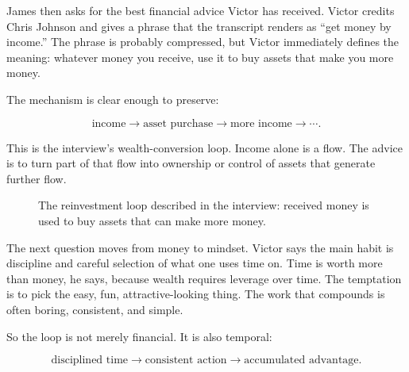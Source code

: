 James then asks for the best financial advice Victor has received. Victor credits Chris Johnson and gives a phrase that the transcript renders as ``get money by income.'' The phrase is probably compressed, but Victor immediately defines the meaning: whatever money you receive, use it to buy assets that make you more money.

The mechanism is clear enough to preserve:

\begin{equation}
\text{income}
\longrightarrow
\text{asset purchase}
\longrightarrow
\text{more income}
\longrightarrow
\cdots.
\end{equation}

This is the interview's wealth-conversion loop. Income alone is a flow. The advice is to turn part of that flow into ownership or control of assets that generate further flow.

\begin{figure}[h]
\centering
{}
\caption{The reinvestment loop described in the interview: received money is used to buy assets that can make more money.}
\end{figure}

The next question moves from money to mindset. Victor says the main habit is discipline and careful selection of what one uses time on. Time is worth more than money, he says, because wealth requires leverage over time. The temptation is to pick the easy, fun, attractive-looking thing. The work that compounds is often boring, consistent, and simple.

So the loop is not merely financial. It is also temporal:

\begin{equation}
\text{disciplined time}
\longrightarrow
\text{consistent action}
\longrightarrow
\text{accumulated advantage}.
\end{equation}

